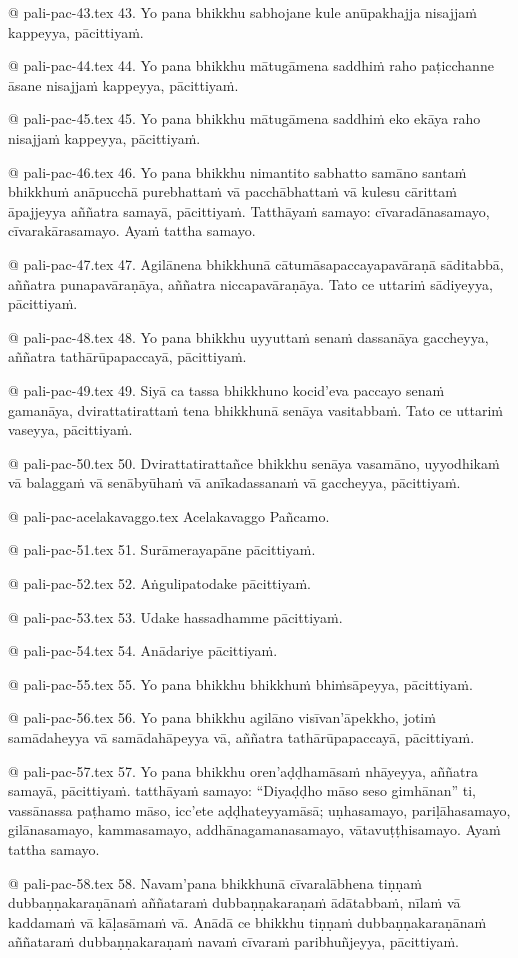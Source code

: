 @ pali-pac-43.tex
43. Yo pana bhikkhu sabhojane kule anūpakhajja nisajjaṁ kappeyya, pācittiyaṁ.

@ pali-pac-44.tex
44. Yo pana bhikkhu mātugāmena saddhiṁ raho paṭicchanne āsane nisajjaṁ kappeyya, pācittiyaṁ.

@ pali-pac-45.tex
45. Yo pana bhikkhu mātugāmena saddhiṁ eko ekāya raho nisajjaṁ kappeyya, pācittiyaṁ.

@ pali-pac-46.tex
46. Yo pana bhikkhu nimantito sabhatto samāno santaṁ bhikkhuṁ anāpucchā purebhattaṁ vā pacchābhattaṁ vā kulesu cārittaṁ āpajjeyya aññatra samayā, pācittiyaṁ. Tatthāyaṁ samayo: cīvaradānasamayo, cīvarakārasamayo. Ayaṁ tattha samayo.

@ pali-pac-47.tex
47. Agilānena bhikkhunā cātumāsapaccayapavāraṇā sāditabbā, aññatra punapavāraṇāya, aññatra niccapavāraṇāya. Tato ce uttariṁ sādiyeyya, pācittiyaṁ.

@ pali-pac-48.tex
48. Yo pana bhikkhu uyyuttaṁ senaṁ dassanāya gaccheyya, aññatra tathārūpapaccayā, pācittiyaṁ.

@ pali-pac-49.tex
49. Siyā ca tassa bhikkhuno kocid’eva paccayo senaṁ gamanāya, dvirattatirattaṁ tena bhikkhunā senāya vasitabbaṁ. Tato ce uttariṁ vaseyya, pācittiyaṁ.

@ pali-pac-50.tex
50. Dvirattatirattañce bhikkhu senāya vasamāno, uyyodhikaṁ vā balaggaṁ vā senābyūhaṁ vā anīkadassanaṁ vā gaccheyya, pācittiyaṁ.

@ pali-pac-acelakavaggo.tex
Acelakavaggo Pañcamo.

@ pali-pac-51.tex
51. Surāmerayapāne pācittiyaṁ.

@ pali-pac-52.tex
52. Aṅgulipatodake pācittiyaṁ.

@ pali-pac-53.tex
53. Udake hassadhamme pācittiyaṁ.

@ pali-pac-54.tex
54. Anādariye pācittiyaṁ.

@ pali-pac-55.tex
55. Yo pana bhikkhu bhikkhuṁ bhiṁsāpeyya, pācittiyaṁ.

@ pali-pac-56.tex
56. Yo pana bhikkhu agilāno visīvan’āpekkho, jotiṁ samādaheyya vā samādahāpeyya vā, aññatra tathārūpapaccayā, pācittiyaṁ.

@ pali-pac-57.tex
57. Yo pana bhikkhu oren’aḍḍhamāsaṁ nhāyeyya, aññatra samayā, pācittiyaṁ. tatthāyaṁ samayo: “Diyaḍḍho māso seso gimhānan” ti, vassānassa paṭhamo māso, icc’ete aḍḍhateyyamāsā; uṇhasamayo, pariḷāhasamayo, gilānasamayo, kammasamayo, addhānagamanasamayo, vātavuṭṭhisamayo. Ayaṁ tattha samayo.

@ pali-pac-58.tex
58. Navam’pana bhikkhunā cīvaralābhena tiṇṇaṁ dubbaṇṇakaraṇānaṁ aññataraṁ dubbaṇṇakaraṇaṁ ādātabbaṁ, nīlaṁ vā kaddamaṁ vā kāḷasāmaṁ vā. Anādā ce bhikkhu tiṇṇaṁ dubbaṇṇakaraṇānaṁ aññataraṁ dubbaṇṇakaraṇaṁ navaṁ cīvaraṁ paribhuñjeyya, pācittiyaṁ.

